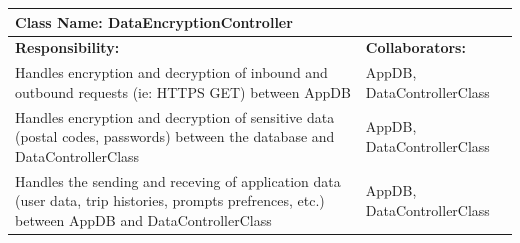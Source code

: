 \documentclass[]{article}
\begin{document}
	\begin{table}[H]
	\centering
	\begin{tabular}{|p{6cm}|p{6cm}|}
	\hline 
		\multicolumn{2}{|l|}{\textbf{Class Name: DataEncryptionController}} \\
	\hline
	\textbf{Responsibility:} & \textbf{Collaborators:} \\
	\hline
	Handles encryption and decryption of inbound and outbound requests (ie: HTTPS GET) between AppDB& AppDB, DataControllerClass\\ \hline
	Handles encryption and decryption of sensitive data (postal codes, passwords) between the database and DataControllerClass& AppDB, DataControllerClass\\ \hline
	Handles the sending and receving of application data (user data, trip histories, prompts prefrences, etc.) between AppDB and DataControllerClass & AppDB, DataControllerClass\\ \hline
	\end{tabular}
	\end{table}
\end{document}
